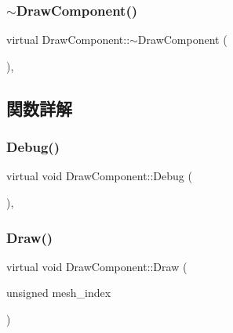 \subsubsection{\texorpdfstring{$\sim$\+Draw\+Component()}{~DrawComponent()}}
{\footnotesize\ttfamily virtual Draw\+Component\+::$\sim$\+Draw\+Component (\begin{DoxyParamCaption}{ }\end{DoxyParamCaption})\hspace{0.3cm}{\ttfamily [inline]}, {\ttfamily [virtual]}}



\subsection{関数詳解}
\mbox{\label{class_draw_component_a9d66e27ebe55d9cf4af70c03b391193d}} 
\subsubsection{\texorpdfstring{Debug()}{Debug()}}
{\footnotesize\ttfamily virtual void Draw\+Component\+::\+Debug (\begin{DoxyParamCaption}{ }\end{DoxyParamCaption})\hspace{0.3cm}{\ttfamily [inline]}, {\ttfamily [virtual]}}

\mbox{\label{class_draw_component_ae84bfb6ccc2fda9e54cdff45057ea2c3}} 
\subsubsection{\texorpdfstring{Draw()}{Draw()}}
{\footnotesize\ttfamily virtual void Draw\+Component\+::\+Draw (\begin{DoxyParamCaption}\item[{unsigned}]{mesh\+\_\+index }\end{DoxyParamCaption})\hspace{0.3cm}{\ttfamily [pure virtual]}}



